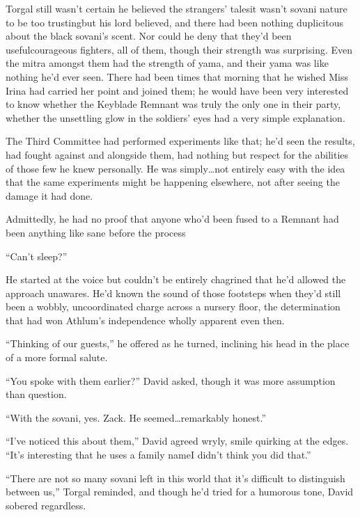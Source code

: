 \scenechange


Torgal still wasn't certain he believed the strangers' tales\textemdash it wasn't sovani nature to be too trusting\textemdash but his lord believed, and there had been nothing duplicitous about the black sovani's scent. Nor could he deny that they'd been useful\textemdash courageous fighters, all of them, though their strength was surprising. Even the mitra amongst them had the strength of yama, and their yama was like nothing he'd ever seen. There had been times that morning that he wished Miss Irina had carried her point and joined them; he would have been very interested to know whether the Keyblade Remnant was truly the only one in their party, whether the unsettling glow in the soldiers' eyes had a very simple explanation.

The Third Committee had performed experiments like that; he'd seen the results, had fought against and alongside them, had nothing but respect for the abilities of those few he knew personally. He was simply\ldots not entirely easy with the idea that the same experiments might be happening elsewhere, not after seeing the damage it had done.

Admittedly, he had no proof that anyone who'd been fused to a Remnant had been anything like sane before the process\textemdash 

``Can't sleep?''

He started at the voice but couldn't be entirely chagrined that he'd allowed the approach unawares. He'd known the sound of those footsteps when they'd still been a wobbly, uncoordinated charge across a nursery floor, the determination that had won Athlum's independence wholly apparent even then.

``Thinking of our guests,'' he offered as he turned, inclining his head in the place of a more formal salute.

``You spoke with them earlier?'' David asked, though it was more assumption than question.

``With the sovani, yes. Zack. He seemed\ldots remarkably honest.''

``I've noticed this about them,'' David agreed wryly, smile quirking at the edges. ``It's interesting that he uses a family name\textemdash I didn't think you did that.''

``There are not so many sovani left in this world that it's difficult to distinguish between us,'' Torgal reminded, and though he'd tried for a humorous tone, David sobered regardless.

